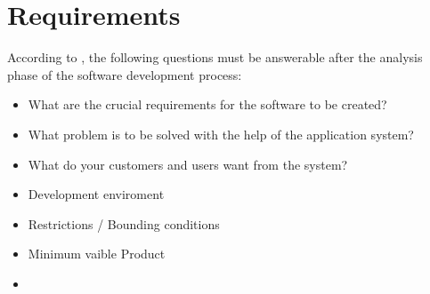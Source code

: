 	\section{Requirements}
	According to \cite{Koubaa2021}, the following questions must be answerable after the analysis phase of the software development process:
	\begin{itemize}
		\item What are the crucial requirements for the software to be created?
		\item What problem is to be solved with the help of the application system?
		\item What do your customers and users want from the system?
		\item Development enviroment
		\item Restrictions / Bounding conditions
		\item Minimum vaible Product
		\item 
	\end{itemize}
	
